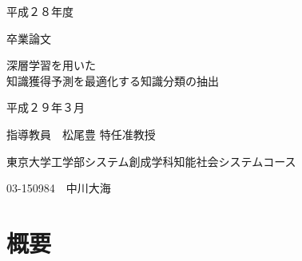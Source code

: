 \documentclass[a4j,11pt]{jreport}
\begin{document}
\begin{center}
\vspace*{1.6cm}
\Large 平成２８年度

\vspace*{0.4cm}
\Large 卒業論文

\vspace*{1.6cm}

\LARGE 深層学習を用いた\\知識獲得予測を最適化する知識分類の抽出
\vspace{6.4cm}

\Large 平成２９年３月

\vspace{0.2cm}
\Large 指導教員　松尾豊 特任准教授

\vspace{0.6cm}
\Large 東京大学工学部システム創成学科知能社会システムコース

\vspace{0.2cm}
\Large 03-150984　中川大海


\end{center}
\normalsize
\thispagestyle{empty}
\clearpage

\chapter*{概要}

\renewcommand{\baselinestretch}{1.3} 




\newpage
{}
\tableofcontents
\newpage
\listoffigures
\newpage
\listoftables
\newpage


\pagestyle{fancy}










\newpage
{}
\label{chap:reference}
\fancyhf{}
\rhead{\thepage}
\cfoot{\thepage}

%





{}

\end{document}
